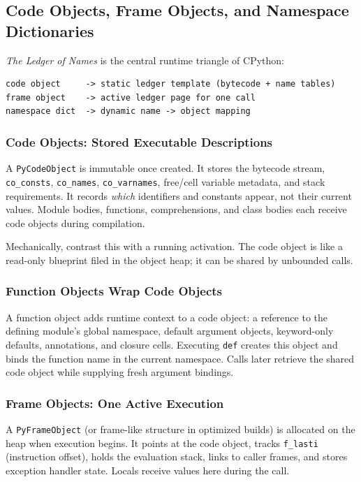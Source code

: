 \subsection{Code Objects, Frame Objects, and Namespace Dictionaries}

\emph{The Ledger of Names} is the central runtime triangle of CPython:

\begin{verbatim}
code object     -> static ledger template (bytecode + name tables)
frame object    -> active ledger page for one call
namespace dict  -> dynamic name -> object mapping
\end{verbatim}

\subsubsection{Code Objects: Stored Executable Descriptions}

A \texttt{PyCodeObject} is immutable once created. It stores the bytecode stream, \texttt{co\_consts}, \texttt{co\_names}, \texttt{co\_varnames}, free/cell variable metadata, and stack requirements. It records \emph{which} identifiers and constants appear, not their current values. Module bodies, functions, comprehensions, and class bodies each receive code objects during compilation.

Mechanically, contrast this with a running activation. The code object is like a read-only blueprint filed in the object heap; it can be shared by unbounded calls.

\subsubsection{Function Objects Wrap Code Objects}

A function object adds runtime context to a code object: a reference to the defining module's global namespace, default argument objects, keyword-only defaults, annotations, and closure cells. Executing \texttt{def} creates this object and binds the function name in the current namespace. Calls later retrieve the shared code object while supplying fresh argument bindings.

\subsubsection{Frame Objects: One Active Execution}

A \texttt{PyFrameObject} (or frame-like structure in optimized builds) is allocated on the heap when execution begins. It points at the code object, tracks \texttt{f\_lasti} (instruction offset), holds the evaluation stack, links to caller frames, and stores exception handler state. Locals receive values here during the call.

